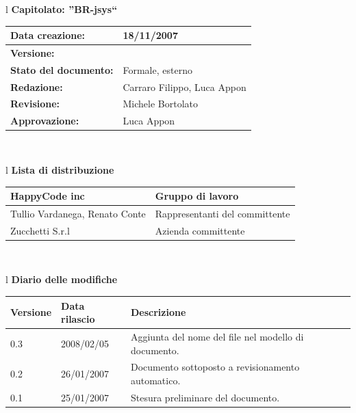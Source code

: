 \documentclass[11pt,titlepage,a4paper]{report}
\begin{document}
\begin{center}
\thispagestyle{plain}
\begin{table}[htbp]
\large{
\begin{tabular}{l}
\Large{\textbf{\textsf{Capitolato: ''BR-jsys``}}} \\
\begin{tabular}{||p{6cm}||p{6cm}||}
\hline
\textbf{Data creazione:} & 18/11/2007 \\ \hline
\textbf{Versione:} & \lv \\ \hline
\textbf{Stato del documento:} & Formale, esterno \\ \hline
\textbf{Redazione:} & Carraro Filippo, Luca Appon \\ \hline
\textbf{Revisione:} & Michele Bortolato   \\ \hline
\textbf{Approvazione:}  & Luca Appon \\ \hline
\end{tabular} \\
\end{tabular}
}
\end{table}

\begin{table}[hbtp]
\large{
\begin{tabular}{l}
\Large{\textbf{\textsf{Lista di distribuzione}}} \\

\begin{tabular}{||p{6cm}||p{6cm}||} \hline
{HappyCode inc}& Gruppo di lavoro\\ \hline
{Tullio Vardanega, Renato Conte}& Rappresentanti del committente \\ \hline
{Zucchetti S.r.l}& Azienda committente\\ \hline
\end{tabular} \\
\end{tabular}
}
\end{table}
\begin{table}[hbtp]
\large{
\begin{tabular}{l}
\Large{\textbf{\textsf{Diario delle modifiche}}} \\
\begin{tabular}{||p{2cm}||p{3.5cm}||p{6cm}||} \hline
\textbf{Versione} & \textbf{Data rilascio} & \textbf{Descrizione} \\ \hline
0.3 & 2008/02/05 & Aggiunta del nome del file nel modello di documento.\\ \hline
0.2 & 26/01/2007 & Documento sottoposto a revisionamento automatico.\\ \hline
0.1 & 25/01/2007 & Stesura preliminare del documento. \\ \hline

\end{tabular} \\
\end{tabular}

}
\end{table}
\end{center}
\newpage
\end{document}

